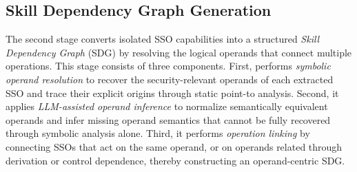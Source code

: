 \subsection{Skill Dependency Graph Generation}
\label{subsec:sdg_generation}

The second stage converts isolated SSO capabilities into a structured \emph{Skill Dependency Graph} (SDG) by resolving the logical operands that connect multiple operations. This stage consists of three components. First, \toolname performs \emph{symbolic operand resolution} to recover the security-relevant operands of each extracted SSO and trace their explicit origins through static point-to analysis. Second, it applies \emph{LLM-assisted operand inference} to normalize semantically equivalent operands and infer missing operand semantics that cannot be fully recovered through symbolic analysis alone. Third, it performs \emph{operation linking} by connecting SSOs that act on the same operand, or on operands related through derivation or control dependence, thereby constructing an operand-centric SDG. 








